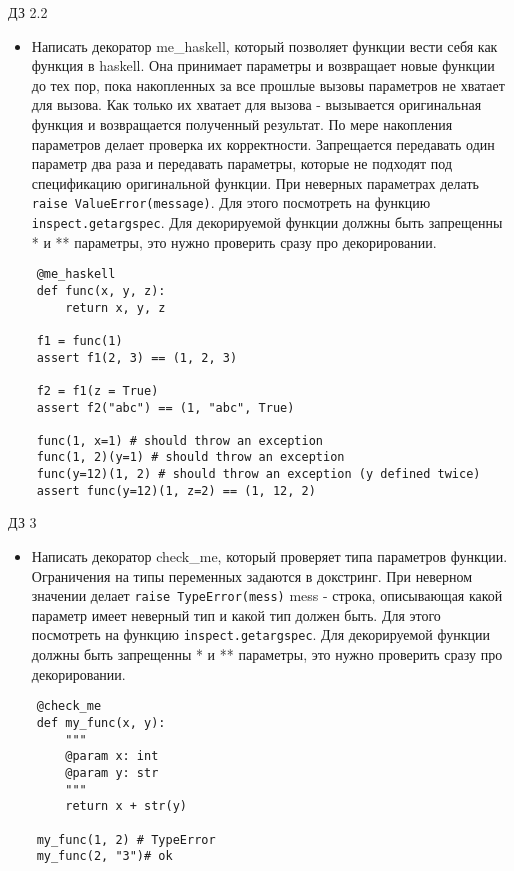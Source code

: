 \documentclass{article}
\begin{document}
\begin{center} ДЗ 2.2 \end{center}
\begin{itemize}
    \item Написать декоратор me\_haskell, который позволяет функции вести себя как функция в haskell.
        Она принимает параметры и возвращает новые функции до тех пор, пока накопленных
        за все прошлые вызовы параметров не хватает для вызова. Как только их хватает для 
        вызова - вызывается оригинальная функция и возвращается полученный результат.
        По мере накопления параметров делает проверка их корректности. 
        Запрещается передавать один параметр два раза и передавать параметры, которые не 
        подходят под спецификацию оригинальной функции. При неверных параметрах
        делать \lstinline!raise ValueError(message)!. 
        Для этого посмотреть на функцию \lstinline!inspect.getargspec!.
        Для декорируемой функции должны быть запрещенны * и ** параметры, это
        нужно проверить сразу про декорировании.
\end{itemize}
\vspace{15pt}
\begin{lstlisting}
    @me_haskell
    def func(x, y, z):
        return x, y, z

    f1 = func(1)
    assert f1(2, 3) == (1, 2, 3)
    
    f2 = f1(z = True)
    assert f2("abc") == (1, "abc", True)

    func(1, x=1) # should throw an exception
    func(1, 2)(y=1) # should throw an exception
    func(y=12)(1, 2) # should throw an exception (y defined twice)
    assert func(y=12)(1, z=2) == (1, 12, 2)
\end{lstlisting}
\newpage

\begin{center} ДЗ 3 \end{center}
\begin{itemize}
    \item Написать декоратор check\_me, который проверяет типа параметров функции.
        Ограничения на типы переменных задаются в докстринг. При неверном
        значении делает \lstinline!raise TypeError(mess)! mess - строка,
        описывающая какой параметр имеет неверный тип и какой тип должен быть.
        Для этого посмотреть на функцию \lstinline!inspect.getargspec!.
        Для декорируемой функции должны быть запрещенны * и ** параметры, это
        нужно проверить сразу про декорировании.
\end{itemize}

\vspace{15pt}
\begin{lstlisting}
    @check_me
    def my_func(x, y):
        """
        @param x: int
        @param y: str
        """
        return x + str(y)

    my_func(1, 2) # TypeError
    my_func(2, "3")# ok
\end{lstlisting}
\newpage

\end{document}
